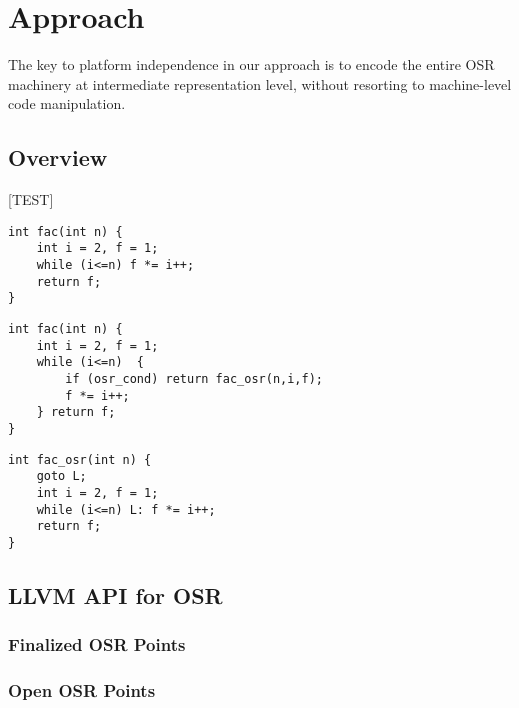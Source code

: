 \section{Approach}
\label{se:approach}

The key to platform independence in our approach is to encode the entire OSR machinery at intermediate representation level, without resorting to machine-level code manipulation.

\subsection{Overview}

[TEST]

\begin{verbatim}
int fac(int n) {
    int i = 2, f = 1;
    while (i<=n) f *= i++;
    return f;
}
\end{verbatim}

\begin{verbatim}
int fac(int n) {
    int i = 2, f = 1;
    while (i<=n)  {
        if (osr_cond) return fac_osr(n,i,f); 
        f *= i++; 
    } return f;
}
\end{verbatim}

\begin{verbatim}
int fac_osr(int n) {
    goto L;
    int i = 2, f = 1;
    while (i<=n) L: f *= i++;
    return f;
}
\end{verbatim}

\subsection{LLVM API for OSR}

\subsubsection{Finalized OSR Points}

\subsubsection{Open OSR Points}


  
  
  
  
  
  
  
  
  
  
  
  
  